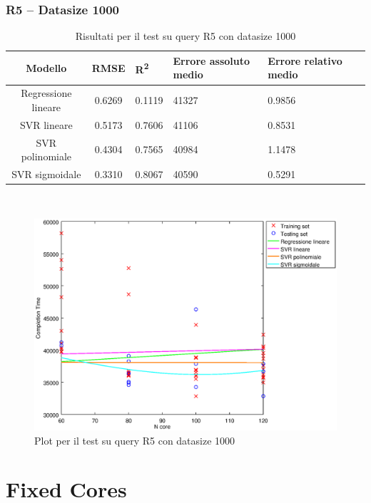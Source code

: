 \documentclass[a4paper,11pt]{article}
\begin{document}
\subsubsection{R5 -- Datasize 1000}
\begin{table}[bhpt]
	\centering
	\begin{adjustbox}{center}
		\begin{tabular}{c | c M{1.2cm} M{2.5cm} M{2.5cm} M{1.8cm}}
			Modello & RMSE & R\textsuperscript{2} & Errore assoluto medio & Errore relativo medio \tabularnewline
			\hline
			Regressione lineare & 0.6269 & 0.1119 &  41327 & 0.9856 \\
			SVR lineare & 0.5173 & 0.7606 &  41106 & 0.8531 \\
			SVR polinomiale & 0.4304 & 0.7565 &  40984 & 1.1478 \\
			SVR sigmoidale & 0.3310 & 0.8067 &  40590 & 0.5291 \\
		\end{tabular}
	\end{adjustbox}
	\\
	\caption{Risultati per il test su query R5 con datasize 1000}
	\label{table_R5_1000}
\end{table}

\begin {figure}[hbtp]
\centering
\includegraphics[width=\textwidth]{output/R5_1000/plot_R5_1000.eps}
\caption {Plot per il test su query R5 con datasize 1000}
\end {figure}

\newpage
\section{Fixed Cores}
\end{document}
